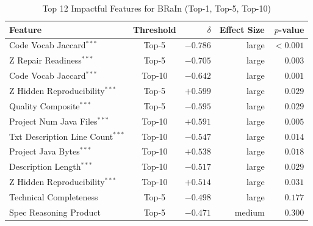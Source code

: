 
\begin{table}[h]
\centering
\caption{Top 12 Impactful Features for BRaIn (Top-1, Top-5, Top-10)}
\label{tab:tool_features_brain_combined}
\begin{tabular}{lcrrr}
\toprule
Feature & Threshold & $\delta$ & Effect Size & $p$-value \\
\midrule
Code Vocab Jaccard$^{***}$ & Top-5 & $-0.786$ & large & $<0.001$ \\
Z Repair Readiness$^{***}$ & Top-5 & $-0.705$ & large & $0.003$ \\
Code Vocab Jaccard$^{***}$ & Top-10 & $-0.642$ & large & $0.001$ \\
Z Hidden Reproducibility$^{***}$ & Top-5 & $+0.599$ & large & $0.029$ \\
Quality Composite$^{***}$ & Top-5 & $-0.595$ & large & $0.029$ \\
Project Num Java Files$^{***}$ & Top-10 & $+0.591$ & large & $0.005$ \\
Txt Description Line Count$^{***}$ & Top-10 & $-0.547$ & large & $0.014$ \\
Project Java Bytes$^{***}$ & Top-10 & $+0.538$ & large & $0.018$ \\
Description Length$^{***}$ & Top-10 & $-0.517$ & large & $0.029$ \\
Z Hidden Reproducibility$^{***}$ & Top-10 & $+0.514$ & large & $0.031$ \\
Technical Completeness & Top-5 & $-0.498$ & large & $0.177$ \\
Spec Reasoning Product & Top-5 & $-0.471$ & medium & $0.300$ \\
\bottomrule
\end{tabular}
\end{table}

